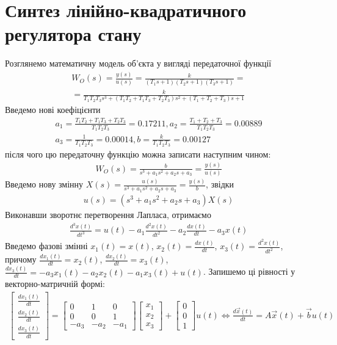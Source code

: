 \chapter{Синтез лінійно-квадратичного регулятора стану}
Розглянемо математичну модель об'єкта у вигляді передаточної функції
\begin{gather*}
    W_O(s) = \frac{y(s)}{u(s)} = \frac{
    k
    }{
        (T_1 s + 1) (T_2 s + 1) (T_3 s + 1)
    } = \\ = \frac{
        k
    }{
        T_1 T_2 T_3 s^3 + \left(T_1 T_2 + T_1 T_3 + T_2 T_3\right) s^2
        + \left(T_1 + T_2 + T_3\right) s + 1
    }
\end{gather*}
Введемо нові коефіцієнти 
\begin{gather*}
    a_1 = \frac{T_1 T_2 + T_1 T_3 + T_2 T_3}{T_1 T_2 T_3} = 0.17211, 
    a_2 = \frac{T_1 + T_2 + T_3}{T_1 T_2 T_3} = 0.00889 \\
    a_3 = \frac{1}{T_1 T_2 T_3} = 0.00014, 
    b = \frac{k}{T_1 T_2 T_3} = 0.00127
\end{gather*}
після чого цю передаточну функцію можна записати наступним чином:
\begin{gather*}
    W_O(s) = \frac{b}{s^3 + a_1 s^2 + a_2 s + a_3} = \frac{y(s)}{u(s)}
\end{gather*}
Введемо нову змінну $X(s) = \frac{u(s)}{s^3 + a_1 s^2 + a_2 s + a_3} = \frac{y(s)}{b}$, звідки
\begin{gather*}
    u(s) = \left(s^3 + a_1 s^2 + a_2 s + a_3\right) X(s)
\end{gather*}
Виконавши зворотнє перетворення Лапласа, отримаємо
\begin{gather*}
    \frac{d^3 x(t)}{dt^3} = u(t) - a_1 \frac{d^2 x(t)}{dt^2} - a_2 \frac{d x(t)}{dt} - a_3 x(t)
\end{gather*}
Введемо фазові змінні $x_1(t) = x(t)$, $x_2(t) = \frac{d x(t)}{dt}$, $x_3(t) = \frac{d^2 x(t)}{dt^2}$,
причому $\frac{d x_1(t)}{dt} = x_2(t)$, $\frac{d x_2(t)}{dt} = x_3(t)$,
$\frac{d x_3(t)}{dt} = -a_3 x_1(t) - a_2 x_2(t) - a_1 x_3(t) + u(t)$. Запишемо ці рівності у векторно-матричній формі:
\begin{gather}\label{eq:state_space}
    \begin{bmatrix}
        \frac{d x_1(t)}{dt} \\ \frac{d x_2(t)}{dt} \\ \frac{d x_3(t)}{dt}
    \end{bmatrix} = 
    \begin{bmatrix}
        0 & 1 & 0 \\
        0 & 0 & 1 \\
        -a_3 & -a_2 & -a_1
    \end{bmatrix}
    \begin{bmatrix}
        x_1 \\ x_2 \\ x_3
    \end{bmatrix} + 
    \begin{bmatrix}
        0 \\ 0 \\ 1
    \end{bmatrix} u(t)
    \Leftrightarrow
    \frac{d \vec{x}(t)}{dt} = A \vec{x}(t) + \vec{b} u(t)
\end{gather}
